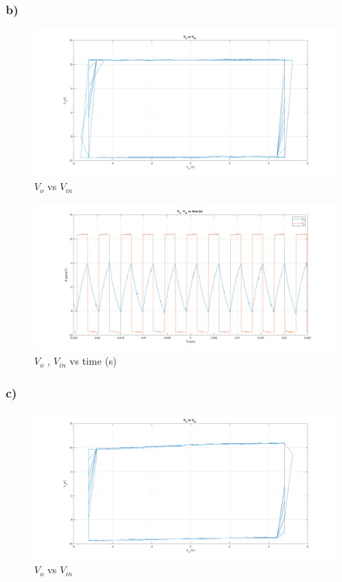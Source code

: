 \documentclass[letterpaper,12pt]{article}
\begin{document}
\subsubsection{b)}

\begin{figure}[H]
	\centering
   \includegraphics[width=1\textwidth]{3b_1.png}
   \caption{\(V_{o}\) vs \(V_{in}\)}
\end{figure}

\begin{figure}[H]
	\centering
   \includegraphics[width=1\textwidth]{3b_2.png}
   \caption{\(V_{o}\) , \(V_{in}\) vs time (s) }
\end{figure}

\subsubsection{c)}

\begin{figure}[H]
	\centering
   \includegraphics[width=1\textwidth]{3c_1.png}
   \caption{\(V_{o}\) vs \(V_{in}\)}
\end{figure}
\end{document}
